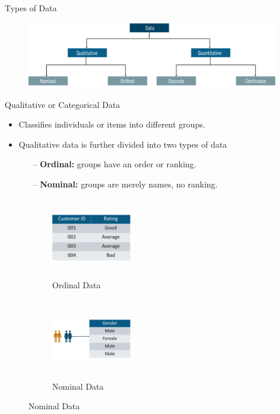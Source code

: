 \begin{frame}[t]{Types of Data}
	\begin{figure} [ht] \vspace{20pt}
		\centering
		\includegraphics[width=0.98\textwidth]{stats_img/types_of_data.png}
	\end{figure}
\end{frame}

\begin{frame}[t]{Qualitative  or Categorical Data}
	\begin{itemize}
		\item Classifies individuals or items into different groups.
		\item Qualitative data is further divided into two types of data
		\begin{itemize}
			\item[--] \textbf{Ordinal:} groups have an order or ranking.
			\item [--]\textbf{Nominal:} groups are merely names, no ranking.
		\end{itemize}
	\end{itemize}

		\begin{figure}[h]
			\centering
			\begin{subfigure}{0.45\textwidth}
				\centering
				\includegraphics[width=3.5cm, 
				height=3.5cm]{stats_img/ordinal.png}
				\caption{Ordinal Data}
			\end{subfigure}
			\hfil
			\begin{subfigure}{0.45\textwidth}
				\centering
				\includegraphics[width=3.5cm, 
				height=3.5cm]{stats_img/nominal.png}
				\caption{Nominal Data}
			\end{subfigure}
		\end{figure}
\end{frame}


